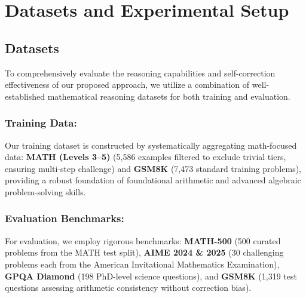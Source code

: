\section{Datasets and Experimental Setup}

\subsection{Datasets}
To comprehensively evaluate the reasoning capabilities and self-correction effectiveness of our proposed approach, we utilize a combination of well-established mathematical reasoning datasets for both training and evaluation.

\subsubsection{Training Data:}
Our training dataset is constructed by systematically aggregating math-focused data: \textbf{MATH (Levels 3--5)} \cite{hendrycks2021measuringmathematicalproblemsolving} (5,586 examples filtered to exclude trivial tiers, ensuring multi-step challenge) and \textbf{GSM8K} \cite{cobbe2021trainingverifierssolvemath} (7,473 standard training problems), providing a robust foundation of foundational arithmetic and advanced algebraic problem-solving skills.

\subsubsection{Evaluation Benchmarks:}
For evaluation, we employ rigorous benchmarks: \textbf{MATH-500} (500 curated problems from the MATH test split), \textbf{AIME 2024 \& 2025} (30 challenging problems each from the American Invitational Mathematics Examination), \textbf{GPQA Diamond} \cite{rein2023gpqagraduatelevelgoogleproofqa} (198 PhD-level science questions), and \textbf{GSM8K} (1,319 test questions assessing arithmetic consistency without correction bias).

